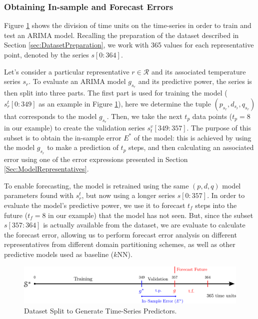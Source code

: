 
\subsubsection{Obtaining In-sample and Forecast Errors}

Figure \ref{Fig:Time-SeriesModel} shows the division of time units on the time-series in order to train and test an ARIMA model. Recalling the preparation of the dataset described in Section \ref{sec:DatasetPreparation}, we work with 365 values for each representative point, denoted by the series $s[0:364]$.

Let's consider a particular representative $r \in \mathcal{R}$ and its associated temperature series $s_r$. To evaluate an ARIMA model $g_{s_r}$ and its predictive power, the series is then split into three parts. The first part is used for training the model ($s^t_r[0:349]$ as an example in Figure \ref{Fig:Time-SeriesModel}), here we determine the tuple $(p_{s_r}, d_{s_r}, q_{s_r})$ that corresponds to the model $g_{s_r}$. Then, we take the next $t_p$ data points ($t_p = 8$ in our example) to create the validation series $s^v_t[349:357]$. The purpose of this subset is to obtain the in-sample error ${E^*}$ of the model: this is achieved by using the model $g_{s_r}$ to make a prediction of $t_p$ steps, and then calculating an associated error using one of the error expressions presented in Section \ref{Sec:ModelRepresentatives}.

To enable forecasting, the model is retrained using the same $(p, d, q)$ model parameters found with $s^t_r$, but now using a longer series $s[0:357]$. In order to evaluate the model's predictive power, we use it to forecast $t_f$ steps into the future ($t_f = 8$ in our example) that the model has not seen. But, since the subset $s[357:364]$ is actually available from the dataset, we are evaluate to calculate the forecast error, allowing us to perform forecast error analysis on different representatives from different domain partitioning schemes, as well as other predictive models used as baseline ($k$NN).
 
\begin{figure}[h]
	\centering
	\includegraphics[scale=0.35]{../Figures/ModelRegion_ModelTS}
	\caption{Dataset Split to Generate Time-Series Predictors.}
	\label{Fig:Time-SeriesModel}
\end{figure}

